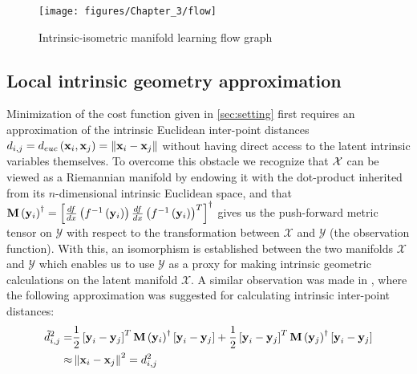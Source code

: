 	\begin{figure}[h]
		\begin{centering}
			\texttt{[image: figures/Chapter\_3/flow]}
			\par\end{centering}
		\caption{Intrinsic-isometric manifold learning flow graph\label{fig:Intrinsic-isometric-manifold-lea}}
	\end{figure}
	
	\subsection{Local intrinsic geometry approximation}
	\label{ssec:Intrinsic-geometry-approximation}
	
	Minimization of the cost function given in \cref{sec:setting} first requires an approximation of the intrinsic Euclidean inter-point distances $d_{i,j}=d_{euc}\left(\text{\ensuremath{\mathbf{x}}}_{i},\text{\ensuremath{\mathbf{x}}}_{j}\right)=\left\Vert {\bf x}_{i}-{\bf x}_{j}\right\Vert $ without having direct access to the latent intrinsic variables themselves. To overcome this obstacle we recognize that ${\cal X}$ can be viewed as a Riemannian manifold by endowing it with the dot-product inherited from its $n$-dimensional intrinsic Euclidean space, and that $\mathbf{M}\left({\bf y}_{i}\right)^{\dagger}=\left[\frac{df}{dx}\left(f^{-1}\left({\bf y}_{i}\right)\right)\frac{df}{dx}\left(f^{-1}\left({\bf y}_{i}\right)\right)^{T}\right]^{\dagger}$ gives us the push-forward metric tensor on $\mathcal{Y}$ with respect to the transformation between $\mathcal{X}$ and $\mathcal{Y}$ (the observation function). With this, an isomorphism is established between the two manifolds $\mathcal{X}$ and $\mathcal{Y}$ which enables
	us to use $\mathcal{Y}$ as a proxy for making intrinsic geometric calculations on the latent manifold $\mathcal{X}$. A similar observation was made in \cite{singer2008non}, where the following approximation was suggested for calculating intrinsic inter-point distances:
	\begin{equation}
		\begin{aligned}
			\tilde{d}_{i,j}^{2}=&\frac{1}{2}\left[\text{\ensuremath{\mathbf{y}}}_{i}-\mathbf{y}_{j}\right]^{T}\mathbf{M}\left({\bf y}_{i}\right)^{\dagger}\left[\text{\ensuremath{\mathbf{y}}}_{i}-\mathbf{y}_{j}\right]+\frac{1}{2}\left[\text{\ensuremath{\mathbf{y}}}_{i}-\mathbf{y}_{j}\right]^{T}\mathbf{M}\left({\bf y}_{j}\right)^{\dagger}\left[\text{\ensuremath{\mathbf{y}}}_{i}-\mathbf{y}_{j}\right] \\ 
			\approx & \left\Vert \text{{\bf x}}_{i}-\text{{\bf x}}_{j}\right\Vert^{2} = d_{i,j}^{2}\label{eq:int_dist_approx}
		\end{aligned}
	\end{equation}
